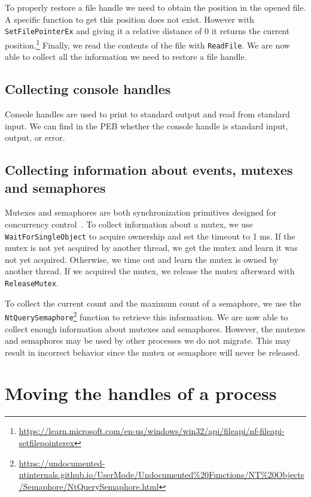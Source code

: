 \documentclass[a4paper, 11pt, english]{report}
\begin{document}
To properly restore a file handle we need to obtain the position in the opened file. A specific function to get this position does not exist. However with \texttt{SetFilePointerEx} and giving it a relative distance of 0 it returns the current position.\footnote{\url{https://learn.microsoft.com/en-us/windows/win32/api/fileapi/nf-fileapi-setfilepointerex}}
Finally, we read the contents of the file with \texttt{ReadFile}. We are now able to collect all the information we need to restore a file handle.

\subsection{Collecting console handles}
Console handles are used to print to standard output and read from standard input. 
We can find in the PEB whether the console handle is standard input, output, or error. 

\subsection{Collecting information about events, mutexes and semaphores}
Mutexes and semaphores are both synchronization primitives designed for concurrency control~\cite{dijkstra1968structure}. To collect information about a mutex, we use \texttt{WaitForSingleObject} to acquire ownership and set the timeout to 1 ms. If the mutex is not yet acquired by another thread, we get the mutex and learn it was not yet acquired. Otherwise, we time out and learn the mutex is owned by another thread. If we acquired the mutex, we release the mutex afterward with \texttt{ReleaseMutex}.
 
To collect the current count and the maximum count of a semaphore, we use the \texttt{NtQuerySemaphore}\footnote{\url{https://undocumented-ntinternals.github.io/UserMode/Undocumented\%20Functions/NT\%20Objects/Semaphore/NtQuerySemaphore.html}} function to retrieve this information. We are now able to collect enough information about mutexes and semaphores. However, the mutexes and semaphores may be used by other processes we do not migrate. This may result in incorrect behavior since the mutex or semaphore will never be released.


\section{Moving the handles of a process}
\label{sec:moving-handles}
\end{document}
